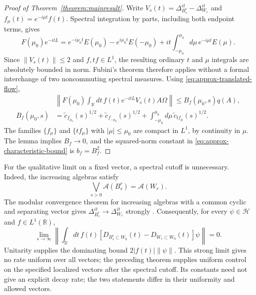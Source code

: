 \documentclass[a4paper,11pt]{article}
\theoremstyle{definition}
\begin{document}
\begin{proof}[Proof of Theorem~\ref{theorem:mainresult}]
Write $V_s(t)=\Delta_{B_s^r}^{it}-\Delta_{W_r}^{it}$ and $f_\mu(t)=e^{-i\mu t}f(t)$. Spectral integration by parts, including both endpoint terms, gives
\begin{equation}
 F(\mu_0)e^{-itL}
 =e^{-i\mu_0t}E(\mu_0)-e^{i\mu_0t}E(-\mu_0)
 +it\int_{-\mu_0}^{\mu_0}d\mu\,e^{-i\mu t}E(\mu).
 \label{eq:approx-spectral-parts}
\end{equation}
Since $\|V_s(t)\|\leq2$ and $f,tf\in L^1$, the resulting ordinary $t$ and $\mu$ integrals are absolutely bounded in norm. Fubini's theorem therefore applies without a formal interchange of two noncommuting spectral measures. Using \eqref{eq:approx-translated-flow},
\begin{align}
 &\left\|F(\mu_0)\int_{\mathbb R}dt\,f(t)e^{-itL}V_s(t)A\Omega\right\|
 \leq B_f(\mu_0,s)q(A),\nonumber\\
 B_f(\mu_0,s)
 &=\widetilde c_{f_{\mu_0}}(s)^{1/2}
 +\widetilde c_{f_{-\mu_0}}(s)^{1/2}
 +\int_{-\mu_0}^{\mu_0}d\mu\,\widetilde c_{tf_\mu}(s)^{1/2}.
 \label{eq:approx-bound-amplitude}
\end{align}
The families $\{f_\mu\}$ and $\{tf_\mu\}$ with $|\mu|\leq\mu_0$ are compact in $L^1$, by continuity in $\mu$. The lemma implies $B_f\to0$, and the squared-norm constant in \eqref{eq:approx-characteristic-bound} is $b_f=B_f^2$.
\end{proof}

For the qualitative limit on a fixed vector, a spectral cutoff is unnecessary. Indeed, the increasing algebras satisfy
\begin{equation}
 \bigvee_{s>0}\mathcal A(B_s^r)=\mathcal A(W_r).
\end{equation}
The modular convergence theorem for increasing algebras with a common cyclic and separating vector gives $\Delta_{B_s^r}^{it}\to\Delta_{W_r}^{it}$ strongly \cite{revolutionizing,takesaki2}. Consequently, for every $\psi\in\mathcal H$ and $f\in L^1(\mathbb R)$,
\begin{equation}
 \lim_{s\to\infty}\left\|\int_{\mathbb R}dt\,f(t)
 [D_{B_s^r\subset W_0}(t)-D_{W_r\subset W_0}(t)]\psi\right\|=0.
 \label{eq:approx-uncut-wedge-limit}
\end{equation}
Unitarity supplies the dominating bound $2|f(t)|\|\psi\|$. This strong limit gives no rate uniform over all vectors; the preceding theorem supplies uniform control on the specified localized vectors after the spectral cutoff. Its constants need not give an explicit decay rate; the two statements differ in their uniformity and allowed vectors.
\end{document}
